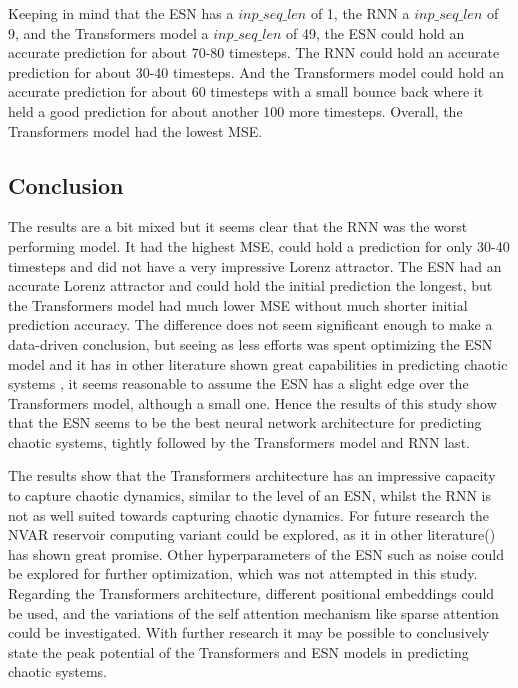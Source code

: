 \documentclass[11pt]{article}
\begin{document}
Keeping in mind that the ESN has a $inp\_seq\_len$ of 1, the RNN a $inp\_seq\_len$ of 9, and the Transformers model a $inp\_seq\_len$ of 49, the ESN could hold an accurate prediction for about 70-80 timesteps. The RNN could hold an accurate prediction for about 30-40 timesteps. And the Transformers model could hold an accurate prediction for about 60 timesteps with a small bounce back where it held a good prediction for about another 100 more timesteps. Overall, the Transformers model had the lowest MSE.

\subsection{Conclusion}
The results are a bit mixed but it seems clear that the RNN was the worst performing model. It had the highest MSE, could hold a prediction for only 30-40 timesteps and did not have a very impressive Lorenz attractor. The ESN had an accurate Lorenz attractor and could hold the initial prediction the longest, but the Transformers model had much lower MSE without much shorter initial prediction accuracy. The difference does not seem significant enough to make a data-driven conclusion, but seeing as less efforts was spent optimizing the ESN model and it has in other literature shown great capabilities in predicting chaotic systems \cite{npg-27-373-2020}, it seems reasonable to assume the ESN has a slight edge over the Transformers model, although a small one. Hence the results of this study show that the ESN seems to be the best neural network architecture for predicting chaotic systems, tightly followed by the Transformers model and RNN last.

The results show that the Transformers architecture has an impressive capacity to capture chaotic dynamics, similar to the level of an ESN, whilst the RNN is not as well suited towards capturing chaotic dynamics. For future research the NVAR reservoir computing variant could be explored, as it in other literature(\cite{cite-key}) has shown great promise. Other hyperparameters of the ESN such as noise could be explored for further optimization, which was not attempted in this study. Regarding the Transformers architecture, different positional embeddings could be used, and the variations of the self attention mechanism like sparse attention could be investigated. With further research it may be possible to conclusively state the peak potential of the Transformers and ESN models in predicting chaotic systems.


\clearpage
\end{document}
